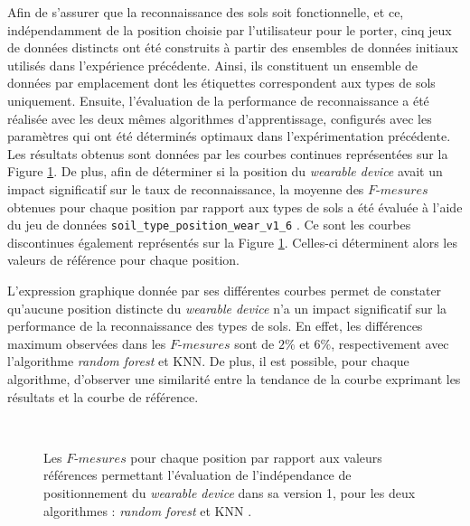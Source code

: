 Afin de s'assurer que la reconnaissance des sols soit fonctionnelle, et ce, indépendamment de la position choisie par l'utilisateur pour le porter, cinq jeux de données distincts ont été construits à partir des ensembles de données initiaux utilisés dans l'expérience précédente. Ainsi, ils constituent un ensemble de données par emplacement dont les étiquettes correspondent aux types de sols uniquement. Ensuite, l'évaluation de la performance de reconnaissance a été réalisée avec les deux mêmes algorithmes d'apprentissage, configurés avec les paramètres qui ont été déterminés optimaux dans l'expérimentation précédente. Les résultats obtenus sont données par les courbes continues représentées sur la Figure \ref{fig:pos_ind_wear_v1}. De plus, afin de déterminer si la position du \textit{wearable device} avait un impact significatif sur le taux de reconnaissance, la moyenne des $F\mbox{-}mesures$ obtenues pour chaque position par rapport aux types de sols a été évaluée à l'aide du jeu de données \og \texttt{soil\_type\_position\_wear\_v1\_6} \fg. Ce sont les courbes discontinues également représentés sur la Figure \ref{fig:pos_ind_wear_v1}. Celles-ci déterminent alors les valeurs de référence pour chaque position.

L'expression graphique donnée par ses différentes courbes permet de constater qu'aucune position distincte du \textit{wearable device} n'a un impact significatif sur la performance de la reconnaissance des types de sols. En effet, les différences maximum observées dans les $F\mbox{-}mesures$ sont de $2\%$ et $6\%$, respectivement avec l'algorithme \textit{random forest} et \acs{KNN}. De plus, il est possible, pour chaque algorithme, d'observer une similarité entre la tendance de la courbe exprimant les résultats et la courbe de référence.

\begin{figure}[H]
  \centering
{}
  \\[20pt]
  \caption[Les $F\mbox{-} mesures$ pour chaque position par rapport aux valeurs références permettant l'évaluation de l'indépendance de positionnement du \textit{wearable device} dans sa version 1, pour les deux algorithmes : \textit{random forest} et \acs{KNN}.]{Les $F\mbox{-} mesures$ pour chaque position par rapport aux valeurs références permettant l'évaluation de l'indépendance de positionnement du \textit{wearable device} dans sa version 1, pour les deux algorithmes : \textit{random forest} et \acs{KNN} \citep{Thullier2017}.}
  \label{fig:pos_ind_wear_v1}
\end{figure}


